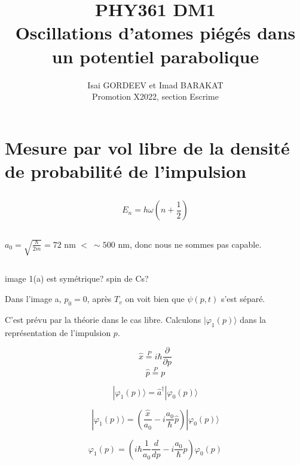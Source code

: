 \documentclass[a4paper,12pt]{article}
\title{PHY361 DM1 \\
 Oscillations d’atomes piégés dans un potentiel parabolique}
\author{Isai GORDEEV et Imad BARAKAT\\
Promotion X2022, section Escrime}
\begin{document}
\maketitle



\section{Mesure par vol libre de la densité de probabilité de l’impulsion}

\subsection{}

$$E_n = h\omega(n+\frac 1 2) $$

\subsection{}

$a_0 = \displaystyle\sqrt{\frac{\hbar}{2m}} = 72$ nm $ <\ \sim500$ nm, donc nous ne sommes pas capable. 

\subsection{}

image 1(a) est symétrique? spin de Cs? 

Dans l'image a, $p_0 = 0$, après $T_v$ on voit bien que $\psi(p, t)$ s'est séparé.

C'est prévu par la théorie dans le cas libre. Calculons $ |\varphi_1(p)\rangle$ dans la représentation de l'impulsion $p$. 

$$\displaystyle\hat x \overset{P}{=}  i\hbar\frac{\partial}{\partial p} $$
$$\displaystyle\hat p \overset{P}{=} p $$

\begin{equation}
	|\varphi_1(p)\rangle = \hat a^\dagger|\varphi_0(p)\rangle  
\end{equation}

\begin{equation}
	|\varphi_1(p)\rangle =  \left( \frac{\hat x} {a_0}- i\frac{a_0}{\hbar}\hat p \right)|\varphi_0(p)\rangle  
\end{equation}

\begin{equation}
	\varphi_1(p)= \left(i\hbar \frac{1} {a_0}\frac{d}{dp} - i\frac{a_0}{\hbar}p \right)\varphi_0(p) 
\end{equation}
\end{document}
